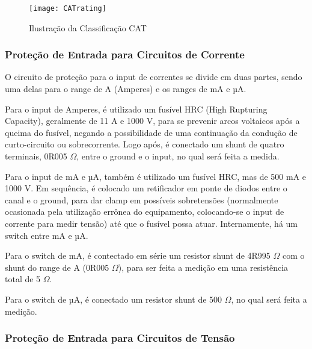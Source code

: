     \begin{figure}[htb]%
        \caption{Ilustração da Classificação CAT}%
        \label{fig:CATrating}%
        \texttt{[image: CATrating]}%
    \end{figure}


    
        \subsubsection{Proteção de Entrada para Circuitos de Corrente}\label{subsec:protecaoCorrente}

        O circuito de proteção para o input de correntes se divide em duas partes, sendo uma delas para o range de A (Amperes) e os ranges de mA e µA.

	    Para o input de Amperes, é utilizado um fusível HRC (High Rupturing Capacity), geralmente de 11 A e 1000 V, para se prevenir arcos voltaicos após a queima do fusível, negando a possibilidade de uma continuação da condução de curto-circuito ou sobrecorrente. Logo após, é conectado um shunt de quatro terminais, 0R005 $\Omega$, entre o ground e o input, no qual será feita a medida.

	    Para o input de mA e µA, também é utilizado um fusível HRC, mas de 500 mA e 1000 V. Em sequência, é colocado um retificador em ponte de diodos entre o canal e o ground, para dar clamp em possíveis sobretensões (normalmente ocasionada pela utilização errônea do equipamento, colocando-se o input de corrente para medir tensão) até que o fusível possa atuar. Internamente, há um switch entre mA e µA. 

        Para o switch de mA, é contectado em série um resistor shunt de 4R995 $\Omega$ com o shunt do range de A (0R005 $\Omega$), para ser feita a medição em uma resistência total de 5 $\Omega$.

        Para o switch de µA, é conectado um resistor shunt de 500 $\Omega$, no qual será feita a medição. %

        \subsubsection{Proteção de Entrada para Circuitos de Tensão}\label{subsec:protecaoTensao}

